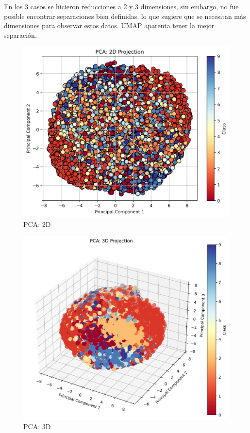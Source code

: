 \documentclass[journal]{IEEEtran}
\begin{document}
En los 3 casos se hicieron reducciones a 2 y 3 dimensiones, sin embargo, no fue posible encontrar separaciones bien definidas, lo que sugiere que se necesitan más dimensiones para observar estos datos. UMAP aparenta tener la mejor separación.

\begin{figure}[H]
        \centering
        \includegraphics[width=0.9\linewidth]{figures/pca_2d_projection.png}
        \caption{PCA: 2D}
        \label{fig:pca_2d}
\end{figure}

\begin{figure}[H]
        \centering
        \includegraphics[width=0.9\linewidth]{figures/pca_3d_projection.png}
        \caption{PCA: 3D}
        \label{fig:pca_3d}
\end{figure}
\end{document}
